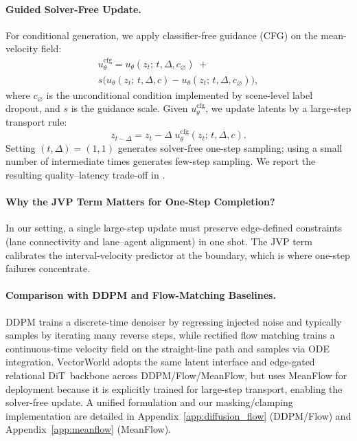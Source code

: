 \documentclass{article}
\newcommand{\EdgeDiT}{edge-gated relational DiT}
\theoremstyle{plain}
\theoremstyle{definition}
\theoremstyle{remark}
\begin{document}
\paragraph{Guided Solver-Free Update.}
For conditional generation, we apply classifier-free guidance (CFG) on the mean-velocity field:
\begin{equation}
\label{eq:mf_cfg}
\begin{gathered}
u_{\theta}^{\mathrm{cfg}} = u_\theta(z_t;\, t,\Delta,c_{\varnothing})
\;+\; \\
s\Big(u_\theta(z_t;\, t,\Delta,c)-u_\theta(z_t;\, t,\Delta,c_{\varnothing})\Big),
\end{gathered}
\end{equation}
where \(c_{\varnothing}\) is the unconditional condition implemented by scene-level label dropout, and \(s\) is the guidance scale.
Given \(u_{\theta}^{\mathrm{cfg}}\), we update latents by a large-step transport rule:
\begin{equation}
\label{eq:mf_update}
z_{t-\Delta} = z_t - \Delta\;u_{\theta}^{\mathrm{cfg}}(z_t;\, t,\Delta,c).
\end{equation}
Setting \((t,\Delta)=(1,1)\) generates solver-free one-step sampling; using a small number of intermediate times generates few-step sampling.
We report the resulting quality--latency trade-off in .

\paragraph{Why the JVP Term Matters for One-Step Completion?}
In our setting, a single large-step update must preserve edge-defined constraints (lane connectivity and lane--agent alignment) in one shot.
The JVP term calibrates the interval-velocity predictor at the boundary, which is where one-step failures concentrate.

\paragraph{Comparison with DDPM and Flow-Matching Baselines.}
DDPM trains a discrete-time denoiser by regressing injected noise and typically samples by iterating many reverse steps, while rectified flow matching trains a continuous-time velocity field on the straight-line path and samples via ODE integration. VectorWorld adopts the same latent interface and \EdgeDiT\ backbone across DDPM/Flow/MeanFlow, but uses MeanFlow for deployment because it is explicitly trained for large-step transport, enabling the solver-free update. A unified formulation and our masking/clamping implementation are detailed in Appendix~\ref{app:diffusion_flow} (DDPM/Flow) and Appendix~\ref{app:meanflow} (MeanFlow).
\end{document}
